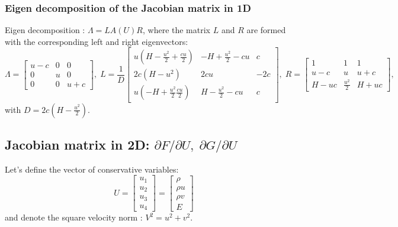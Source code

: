 \documentclass{article}
\begin{document}
\subsubsection{Eigen decomposition of the Jacobian matrix in 1D}

Eigen decomposition : $\Lambda = L A(U) R$, where the matrix $L$ and $R$ are formed with the corresponding left and right eigenvectors:
\begin{equation}
  \Lambda = \left[
    \begin{array}{ccc}
      u-c& 0 & 0\\
      0  & u & 0\\
      0  & 0 & u+c
    \end{array}
  \right],\;
  L=\frac{1}{D}\left[
    \begin{array}{ccc}
      u(H-\frac{u^2}{2}+\frac{cu}{2}) & -H+\frac{u^2}{2}-cu & c\\
      2c(H-u^2) & 2cu & -2c\\
      u(-H+\frac{u^2}{2}\frac{cu}{2}) & H-\frac{u^2}{2}-cu & c
    \end{array}
  \right],\;
  R=\left[
    \begin{array}{ccc}
      1    & 1             & 1\\
      u-c  & u             & u+c\\
      H-uc & \frac{u^2}{2} & H+uc
    \end{array}
  \right],
\end{equation}
with $D=2 c(H-\frac{u^2}{2})$.

\newpage
\subsection{Jacobian matrix in 2D: \boldmath $\partial F/\partial U, \; \partial G/\partial U$}

Let's define the vector of conservative variables:
\begin{equation}
  U = \left[
    \begin{array}{c}
      u_1\\
      u_2\\
      u_3\\
      u_4
    \end{array}
  \right] = \left[
    \begin{array}{c}
      \rho\\
      \rho u\\
      \rho v\\
      E
    \end{array}
  \right]
\end{equation}
and denote the square velocity norm : $V^2=u^2+v^2$.
\end{document}
